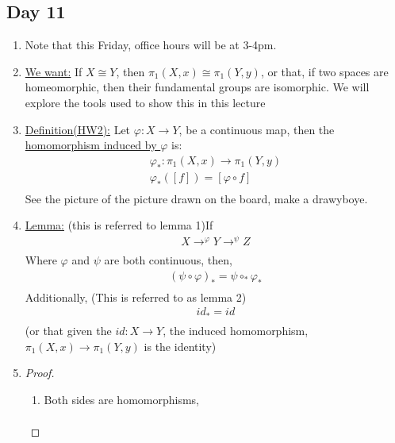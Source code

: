 \subsection{Day 11}
    \begin{enumerate}
        \item Note that this Friday, office hours will be at 3-4pm.
        \item \underline{We want:} If $X\cong Y$, then $\pi_1(X,x)\cong \pi_1(Y,y)$,
            or that, if two spaces are homeomorphic, then their fundamental groups are isomorphic. We
            will explore the tools used to show this in this lecture
        \item \underline{Definition(HW2):} Let $\varphi: X\rightarrow Y$, be a continuous
            map, then the \underline{homomorphism induced by $\varphi$} is:
            \begin{align*}
                \varphi_{*}: \pi_1(X,x)\rightarrow \pi_1(Y,y)\\
                \varphi_{*}([f])=[\varphi\circ f]\\
            \end{align*}
            See the picture of the picture drawn on the board, make a drawyboye.
        \item \underline{Lemma:} (this is referred to lemma 1)If
            \begin{align*}
                X\rightarrow^{\varphi}Y\rightarrow^{\psi}Z\\
            \end{align*}
            Where $\varphi$ and $\psi$ are both continuous, then,
            \begin{align*}
                (\psi \circ \varphi)_{*}=\psi \circ_{*} \varphi_{*}\\
            \end{align*}
            Additionally, (This is referred to as lemma 2)
            \begin{align*}
                {id}_{*}=id\\
            \end{align*}
            (or that given the $id: X\rightarrow Y$, the induced homomorphism,
            $\pi_{1}(X,x)\rightarrow \pi_{1}(Y,y)$ is the identity)
        \item \begin{proof}
                \begin{enumerate}
                    \item Both sides are homomorphisms,
                        \begin{align}

\end{align}
\end{enumerate}
\end{proof}
\end{enumerate}
